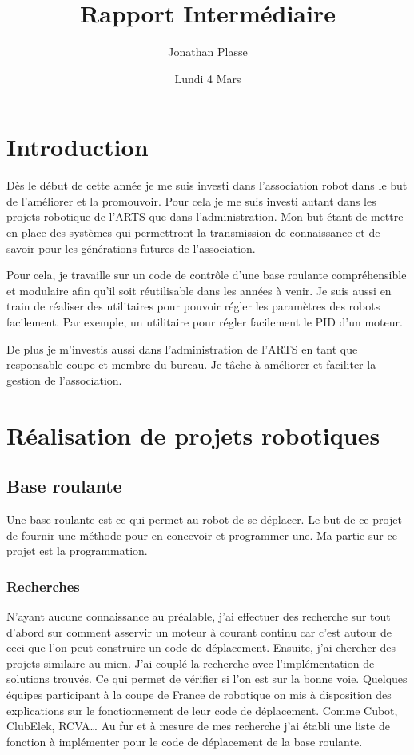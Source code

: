 \documentclass[12pt,a4paper]{report}
\title{Rapport Intermédiaire}
\author{Jonathan Plasse}
\date{Lundi 4 Mars}
\begin{document}
\maketitle

\chapter*{Introduction}
  Dès le début de cette année je me suis investi dans l'association robot dans le but de l'améliorer et la promouvoir.
  Pour cela je me suis investi autant dans les projets robotique de l'ARTS que dans l'administration.
  Mon but étant de mettre en place des systèmes qui permettront la transmission de connaissance et de savoir pour les générations futures de l'association.

  Pour cela, je travaille sur un code de contr\^ole d'une base roulante compréhensible et modulaire afin qu'il soit réutilisable dans les années à venir.
  Je suis aussi en train de réaliser des utilitaires pour pouvoir régler les paramètres des robots facilement. Par exemple, un utilitaire pour régler facilement le PID d'un moteur.

  De plus je m'investis aussi dans l'administration de l'ARTS en tant que responsable coupe et membre du bureau. Je t\^ache à améliorer et faciliter la gestion de l'association.

\chapter{Réalisation de projets robotiques}


  \section{Base roulante}
    Une base roulante est ce qui permet au robot de se déplacer. Le but de ce projet de fournir une méthode pour en concevoir et programmer une. Ma partie sur ce projet est la programmation.

    \subsection{Recherches}
      N'ayant aucune connaissance au préalable, j'ai effectuer des recherche sur tout d'abord sur comment asservir un moteur à courant continu car c'est autour de ceci que l'on peut construire un code de déplacement. Ensuite, j'ai chercher des projets similaire au mien.
      J'ai couplé la recherche avec l'implémentation de solutions trouvés. Ce qui permet de vérifier si l'on est sur la bonne voie.
      Quelques équipes participant à la coupe de France de robotique on mis à disposition des explications sur le fonctionnement de leur code de déplacement. Comme Cubot, ClubElek, RCVA…
      Au fur et à mesure de mes recherche j'ai établi une liste de fonction à implémenter pour le code de déplacement de la base roulante.
\end{document}
